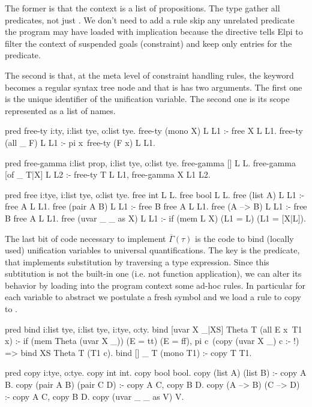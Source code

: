 \documentclass[a4paper, 11pt]{book}
\begin{document}
The former is that the context is a list of propositions. The 
type gather all predicates, not just . We don't need to add
a rule skip any unrelated predicate the program may have loaded with implication
because the  directive
tells Elpi to filter the context of suspended goals (constraint) and keep only
entries for the  predicate.

The second is that, at the meta level of constraint handling rules, the
 keyword becomes a regular syntax tree node and that is
has two arguments. The first one is the unique identifier of the unification
variable. The second one is its scope represented as a list of names.
  

\begin{elpicode}
pred free-ty i:ty, i:list tye, o:list tye.
free-ty (mono X) L L1 :- free X L L1.
free-ty (all _ F) L L1 :- pi x\ free-ty (F x) L L1.

pred free-gamma i:list prop, i:list tye, o:list tye.
free-gamma [] L L.
free-gamma [of _ T|X] L L2 :- free-ty T L L1, free-gamma X L1 L2.

pred free i:tye, i:list tye, o:list tye.
free int L L.
free bool L L.
free (list A) L L1 :- free A L L1.
free (pair A B) L L1 :- free B {free A L} L1.
free (A --> B) L L1 :- free B {free A L} L1.
free (uvar _ _ as X) L L1 :- if (mem L X) (L1 = L) (L1 = [X|L]).
\end{elpicode}

The last bit of code necessary to implement $\overline{\Gamma}(\tau)$ is
the code to bind (locally used) unification variables to universal quantifications.
The key is the  predicate, that implements substitution
by traversing a type expression. Since this subtitution is not the built-in
one (i.e. not function application), we can alter its behavior by loading
into the program context some ad-hoc rules. In particular for
each variable  to abstract we postulate a fresh symbol
 and we load a rule to copy  to .

\begin{elpicode}
pred bind i:list tye, i:list tye, i:tye, o:ty.
bind [uvar X _|XS] Theta T (all E x\ T1 x) :- %
  if (mem Theta (uvar X _)) (E = tt) (E = ff),
  pi c\ (copy (uvar X _) c :- !) => bind XS Theta T (T1 c).
bind [] _ T (mono T1) :- copy T T1. %

pred copy i:tye, o:tye.
copy int int.
copy bool bool.
copy (list A) (list B) :- copy A B.
copy (pair A B) (pair C D) :- copy A C, copy B D.
copy (A --> B) (C --> D) :- copy A C, copy B D.
copy (uvar _ _ as V) V.
\end{elpicode}
\end{document}
